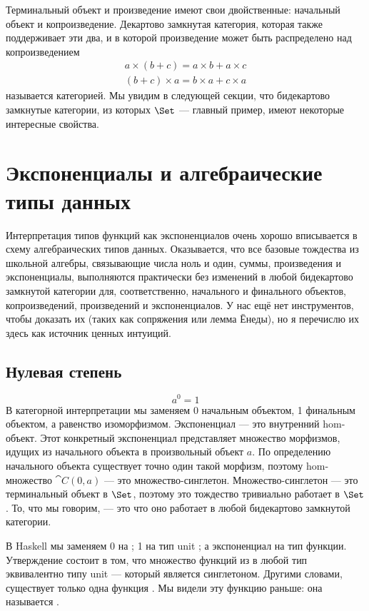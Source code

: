 Терминальный объект и произведение имеют свои двойственные: начальный объект
и копроизведение. Декартово замкнутая категория, которая также поддерживает эти
два, и в которой произведение может быть распределено над копроизведением
\begin{gather*}
  a \times (b + c) = a \times b + a \times c \\
  (b + c) \times a = b \times a + c \times a
\end{gather*}
называется  категорией. Мы увидим в следующей
секции, что бидекартово замкнутые категории, из которых $\Set$ ---
главный пример, имеют некоторые интересные свойства.

\section{Экспоненциалы и алгебраические типы данных}

Интерпретация типов функций как экспоненциалов очень хорошо вписывается в
схему алгебраических типов данных. Оказывается, что все базовые
тождества из школьной алгебры, связывающие числа ноль и один, суммы,
произведения и экспоненциалы, выполняются практически без изменений в любой бидекартово
замкнутой категории для, соответственно, начального и финального объектов,
копроизведений, произведений и экспоненциалов. У нас ещё нет инструментов, чтобы
доказать их (таких как сопряжения или лемма Ёнеды), но я перечислю их
здесь как источник ценных интуиций.

\subsection{Нулевая степень}

\[a^{0} = 1\]
В категорной интерпретации мы заменяем 0 начальным объектом,
1 финальным объектом, а равенство изоморфизмом. Экспоненциал ---
это внутренний hom-объект. Этот конкретный экспоненциал представляет
множество морфизмов, идущих из начального объекта в произвольный объект
$a$. По определению начального объекта существует точно
один такой морфизм, поэтому hom-множество $\cat{C}(0, a)$ --- это множество-синглетон.
Множество-синглетон --- это терминальный объект в $\Set$, поэтому это тождество
тривиально работает в $\Set$. То, что мы говорим, --- это что оно работает в
любой бидекартово замкнутой категории.

В Haskell мы заменяем 0 на ; 1 на тип unit
\code{()}; а экспоненциал на тип функции. Утверждение состоит в том, что
множество функций из  в любой тип 
эквивалентно типу unit --- который является синглетоном. Другими словами,
существует только одна функция . Мы видели
эту функцию раньше: она называется .

